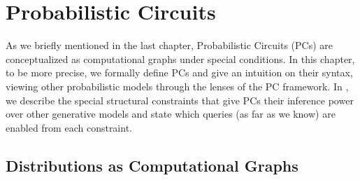 \chapter{Probabilistic Circuits}
\label{ch:pc}

As we briefly mentioned in the last chapter, Probabilistic Circuits (PCs) are conceptualized as
computational graphs under special conditions. In this chapter,  to be more precise,
we formally define PCs and give an intuition on their syntax, viewing other probabilistic models
through the lenses of the PC framework. In , we describe the special structural
constraints that give PCs their inference power over other generative models and state which
queries (as far as we know) are enabled from each constraint.

\section{Distributions as Computational Graphs}
\label{sec:pc}

